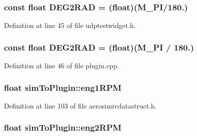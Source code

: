 \hypertarget{group___aero_sim_r_c_gacbfd2fc3314cc3762ea0c3720979f8bc}{
\subsubsection[{\-D\-E\-G2\-R\-A\-D}]{\setlength{\rightskip}{0pt plus 5cm}const float {\bf \-D\-E\-G2\-R\-A\-D} = (float)(\-M\-\_\-\-P\-I/180.)}}\label{group___aero_sim_r_c_gacbfd2fc3314cc3762ea0c3720979f8bc}


\-Definition at line 45 of file udptestwidget.\-h.

\hypertarget{group___aero_sim_r_c_gacbfd2fc3314cc3762ea0c3720979f8bc}{
\subsubsection[{\-D\-E\-G2\-R\-A\-D}]{\setlength{\rightskip}{0pt plus 5cm}const float {\bf \-D\-E\-G2\-R\-A\-D} = (float)(\-M\-\_\-\-P\-I / 180.)}}\label{group___aero_sim_r_c_gacbfd2fc3314cc3762ea0c3720979f8bc}


\-Definition at line 46 of file plugin.\-cpp.

\hypertarget{group___aero_sim_r_c_ga92a2016c6887c978c9179cf3bf117c5a}{
\subsubsection[{eng1\-R\-P\-M}]{\setlength{\rightskip}{0pt plus 5cm}float {\bf sim\-To\-Plugin\-::eng1\-R\-P\-M}}}\label{group___aero_sim_r_c_ga92a2016c6887c978c9179cf3bf117c5a}


\-Definition at line 103 of file aerosimrcdatastruct.\-h.

\hypertarget{group___aero_sim_r_c_ga2fa372d547f9f33642415f454bccf402}{
\subsubsection[{eng2\-R\-P\-M}]{\setlength{\rightskip}{0pt plus 5cm}float {\bf sim\-To\-Plugin\-::eng2\-R\-P\-M}}}\label{group___aero_sim_r_c_ga2fa372d547f9f33642415f454bccf402}


